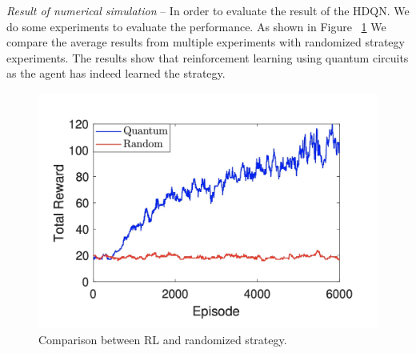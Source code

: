 \textit{Result of numerical simulation} -- In order to evaluate the result of the HDQN. We do some experiments to evaluate the performance. As shown in Figure ~\ref{stochastic} We compare the average results from multiple experiments with randomized strategy experiments. The results show that reinforcement learning using quantum circuits as the agent has indeed learned the strategy.
\begin{figure}[ht]
  \centering
  \includegraphics[scale=0.3]{tex/5.4.5_RL/result_paper.jpg}
  \caption{\label{stochastic} Comparison between RL and randomized strategy.}
\end{figure}
